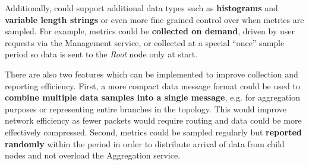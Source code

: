 Additionally, \dcamp could support additional data types such as \textbf{histograms} and \textbf{variable length
strings} or even more fine grained control over when metrics are sampled. For example, metrics could be
\textbf{collected on demand}, driven by user requests via the Management service, or collected at a special ``once''
sample period so data is sent to the \textit{Root} node only at start.

There are also two features which can be implemented to improve collection and reporting efficiency. First, a more
compact data message format could be used to \textbf{combine multiple data samples into a single message}, e.g. for
aggregation purposes or representing entire branches in the topology. This would improve network efficiency as fewer
packets would require routing and data could be more effectively compressed. Second, metrics could be sampled regularly
but \textbf{reported randomly} within the period in order to distribute arrival of data from child nodes and not
overload the Aggregation service.
